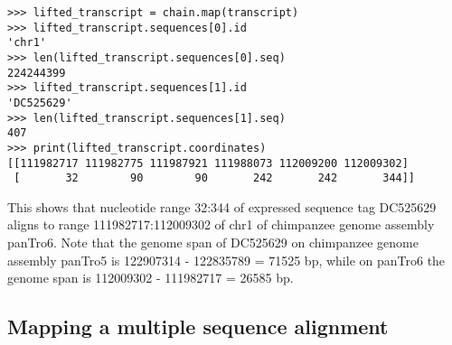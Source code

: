 \begin{verbatim}
>>> lifted_transcript = chain.map(transcript)
>>> lifted_transcript.sequences[0].id
'chr1'
>>> len(lifted_transcript.sequences[0].seq)
224244399
>>> lifted_transcript.sequences[1].id
'DC525629'
>>> len(lifted_transcript.sequences[1].seq)
407
>>> print(lifted_transcript.coordinates)
[[111982717 111982775 111987921 111988073 112009200 112009302]
 [       32        90        90       242       242       344]]
\end{verbatim}
This shows that nucleotide range 32:344 of expressed sequence tag DC525629 aligns to range 111982717:112009302 of chr1 of chimpanzee genome assembly panTro6. Note that the genome span of DC525629 on chimpanzee genome assembly panTro5 is 122907314 - 122835789 = 71525 bp, while on panTro6 the genome span is 112009302 - 111982717 = 26585 bp.

\subsection{Mapping a multiple sequence alignment}

